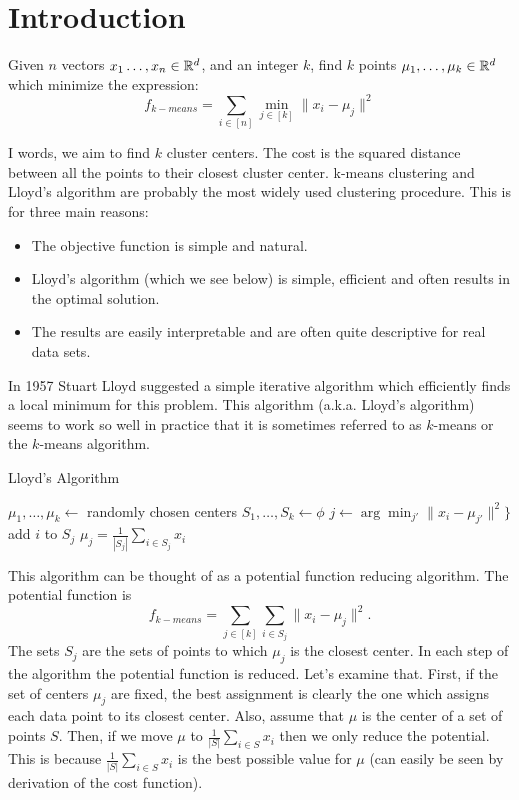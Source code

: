 \documentclass{article}
\begin{document}

\section{Introduction}
\begin{definition}[$k$-means]
Given $n$ vectors $x_1\ldots,x_n\in {\mathbb{R}}^d$, and an integer $k$, find $k$ points $\mu_1,\ldots,\mu_k \in {\mathbb{R}}^d$
which minimize the expression:
\[
f_{k-means} = \sum_{i \in [n]} \min_{j \in [k]} \|x_i - \mu_j \|^2
\]
\end{definition}
I words, we aim to find $k$ cluster centers. The cost is the squared distance between all the points to their closest cluster center.
k-means clustering and Lloyd's algorithm \cite{Lloyd82leastsquares} are probably the most widely used clustering procedure.
This is for three main reasons:
\begin{itemize} 
\item The objective function is simple and natural.
\item Lloyd's algorithm (which we see below) is simple, efficient and often results in the optimal solution.  
\item The results are easily interpretable and are often quite descriptive for real data sets. 
\end{itemize}
In 1957 Stuart Lloyd suggested a simple iterative algorithm which efficiently finds a local minimum for this problem.
This algorithm (a.k.a. Lloyd's algorithm) seems to work so well in practice that it is sometimes referred to as $k$-means or the $k$-means algorithm.

\begin{algorithm}
\caption{Lloyd's Algorithm}
\begin{algorithmic}
\STATE $\mu_1,\ldots,\mu_k \leftarrow$ randomly chosen centers
\STATE $S_1,\ldots,S_k \leftarrow \phi$
	\STATE $j \leftarrow \arg\min_{j'}\|x_i - \mu_{j'}\|^2 \}$
	\STATE add $i$ to $S_j$
\ENDFOR
{}
	\STATE $\mu_j = \frac{1}{|S_j|}\sum_{i \in S_j} x_i$
\ENDFOR
\ENDWHILE
\end{algorithmic}
\end{algorithm}
This algorithm can be thought of as a potential function reducing algorithm.
The potential function is 
\[
f_{k-means} = \sum_{j \in [k]} \sum_{i \in S_j} \|x_i - \mu_j\|^2.
\]
The sets $S_j$ are the sets of points to which $\mu_j$ is the closest center.
In each step of the algorithm the potential function is reduced.
Let's examine that.
First, if the set of centers $\mu_j$ are fixed, the best assignment is clearly the one which assigns
each data point to its closest center. Also, assume that $\mu$ is the center of a set of points $S$.
Then, if we move $\mu$ to $\frac{1}{|S|}\sum_{i \in S} x_i$ then we only reduce the potential.
This is because $\frac{1}{|S|}\sum_{i \in S} x_i$ is the best possible value for $\mu$ (can easily be seen by derivation of the cost function).
\end{document}
